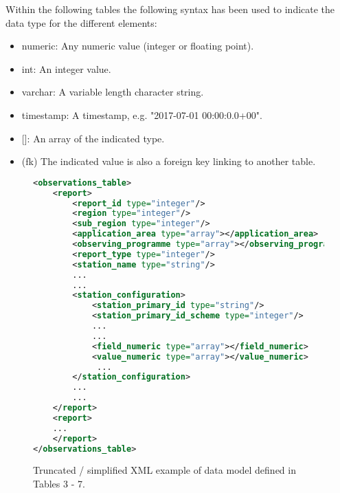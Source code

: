 \documentclass[a4paper]{article}
\newcounter{FramedDepth}
\newenvironment{Framed}{%
  \addtocounter{FramedDepth}{1}
  \ifcase\theFramedDepth\def\FrameColour{white!50}%
    \or\def\FrameColour{white!50}%
    \or\def\FrameColour{white!50}%
    \or\def\FrameColour{white!50}%
    \fi%
  \begin{mdframed}[style=Framed,backgroundcolor=\FrameColour]%
}{\end{mdframed}\addtocounter{FramedDepth}{-1}}
\begin{document}
Within the following tables the following syntax has been used to indicate the data type for the different elements: \\
\begin{itemize}
\item numeric: \tabto{3 cm} Any numeric value (integer or floating point).
\item int: \tabto{3 cm} An integer value.
\item varchar: \tabto{3 cm} A variable length character string.
\item timestamp: \tabto{3 cm} A timestamp, e.g. "2017-07-01 00:00:0.0+00".
\item {[]}:\tabto{3 cm} An array of the indicated type.
\item (fk)  \tabto{3 cm} The indicated value is also a foreign key linking to another table.
\end {itemize}

\begin{figure}
\begin{Framed}
\begin{lstlisting}[language=XML]
<observations_table>
    <report>
        <report_id type="integer"/>
        <region type="integer"/>
        <sub_region type="integer"/>
        <application_area type="array"></application_area>
        <observing_programme type="array"></observing_programme>
        <report_type type="integer"/>
        <station_name type="string"/>
        ...
        ...
        <station_configuration>
            <station_primary_id type="string"/>
            <station_primary_id_scheme type="integer"/>
            ...
            ...
            <field_numeric type="array"></field_numeric>
            <value_numeric type="array"></value_numeric>
             ...
        </station_configuration>
        ...
        ...
    </report>
    <report>
    ...
    </report>
</observations_table>
\end{lstlisting}
\end{Framed}
\caption{Truncated / simplified XML example of data model defined in Tables 3 - 7.}
\end{figure}
\FloatBarrier



\end{document}
